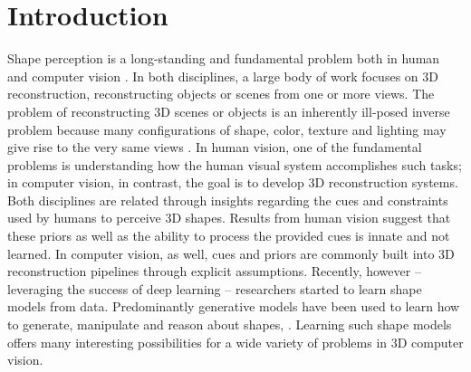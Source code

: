 \chapter{Introduction}

Shape perception is a long-standing and fundamental problem both in human
\cite{Pizlo:2007,Pizlo:2010}
and computer vision \cite{FurukawaHernandez:2015}.
In both disciplines, a large body of work focuses on 3D reconstruction, \eg
reconstructing objects or scenes from one or more views. 
The problem of reconstructing 3D scenes or objects is an inherently ill-posed
inverse problem because many configurations of shape, color, texture and
lighting may give rise to the very same views \cite{FurukawaHernandez:2015}.
In human vision, one of the fundamental problems is understanding
how the human visual system accomplishes such tasks; in computer vision,
in contrast, the goal is to develop 3D reconstruction systems.
Both disciplines are related through insights regarding the cues and constraints
used by humans to perceive 3D shapes. Results from human vision \cite{Pizlo:2007,Pizlo:2010}
suggest that these priors as well as the ability to process the provided cues
is innate and not learned. In computer vision, as well, cues and priors are commonly
built into 3D reconstruction pipelines through explicit assumptions.
Recently, however -- leveraging the success of deep learning -- researchers
started to learn shape models from data. Predominantly generative models have
been used to learn how to generate, manipulate and reason about shapes,
\eg \cite{GirdharGupta:2016,
DaiNiessner:2016,SharmaFritz:2016,BrockWeston:2016,
WuSongXiao:2015,WuTenenbaum:2016}. Learning such shape models
offers many interesting possibilities for a wide variety of problems
in 3D computer vision.

